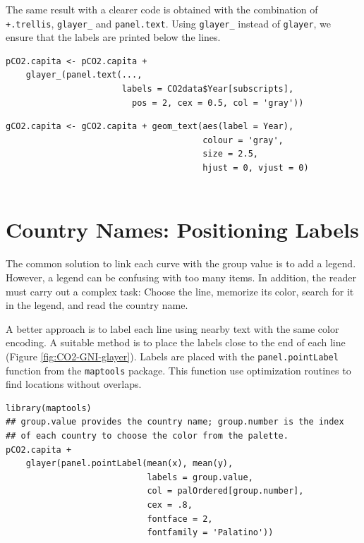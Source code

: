 \documentclass[smallroyalvopaper]{memoir}
\begin{document}
The same result with a clearer code is obtained with the combination
of \texttt{+.trellis}, \texttt{glayer\_} and \texttt{panel.text}. Using \texttt{glayer\_} instead of
\texttt{glayer}, we ensure that the labels are printed below the lines.


\lstset{language=r,label= ,caption= ,captionpos=b,numbers=none}
\begin{lstlisting}
pCO2.capita <- pCO2.capita +
    glayer_(panel.text(...,
                       labels = CO2data$Year[subscripts],
                         pos = 2, cex = 0.5, col = 'gray'))
\end{lstlisting}

\lstset{language=r,label= ,caption= ,captionpos=b,numbers=none}
\begin{lstlisting}
gCO2.capita <- gCO2.capita + geom_text(aes(label = Year),
                                       colour = 'gray',
                                       size = 2.5,
                                       hjust = 0, vjust = 0)
  
\end{lstlisting}

\section{Country Names: Positioning Labels}
\label{sec:org974853f}
The common solution to link each curve with the group value is to add
a legend. However, a legend can be confusing with too many items. In
addition, the reader must carry out a complex task: Choose the line,
memorize its color, search for it in the legend, and read the country
name.

A better approach is to label each line using nearby text with the
same color encoding. A suitable method is to place the labels
close to the end of each line (Figure
\ref{fig:CO2-GNI-glayer}). Labels are placed with the
\texttt{panel.pointLabel} function from the \texttt{maptools} package. This
function use optimization routines to find locations without
overlaps.


\lstset{language=r,label= ,caption= ,captionpos=b,numbers=none}
\begin{lstlisting}
library(maptools)  
## group.value provides the country name; group.number is the index
## of each country to choose the color from the palette.
pCO2.capita +
    glayer(panel.pointLabel(mean(x), mean(y),
                            labels = group.value,
                            col = palOrdered[group.number],
                            cex = .8,
                            fontface = 2,
                            fontfamily = 'Palatino'))
\end{lstlisting}
\end{document}

